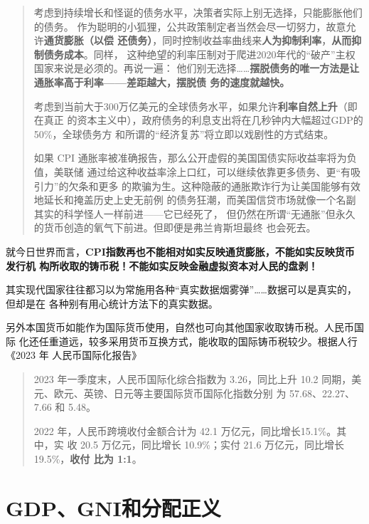 \begin{quotation}
  考虑到持续增长和怪诞的债务水平，决策者实际上别无选择，只能膨胀他们的债务。
  作为聪明的小狐狸，公共政策制定者当然会尽一切努力，故意允许\textbf{通货膨胀（以偿
    还债务）}，同时控制收益率曲线来\textbf{人为抑制利率}，\textbf{从而抑制债务成本}。同样，
  这种绝望的利率压制对于爬进2020年代的“破产”主权国家来说是必须的。再说一遍：
  他们别无选择……\textbf{摆脱债务的唯一方法是让通胀率高于利率——差距越大，摆脱债
    务的速度就越快。}

  考虑到当前大于300万亿美元的全球债务水平，如果允许\textbf{利率自然上升}（即在真正
  的资本主义中），政府债务的利息支出将在几秒钟内大幅超过GDP的50\%，全球债务方
  和所谓的“经济复苏”将立即以戏剧性的方式结束。

  如果 CPI 通胀率被准确报告，那么公开虚假的美国国债实际收益率将为负值，美联储
  通过给这种收益率涂上口红，可以继续依靠更多债务、更“有吸引力”的欠条和更多
  的欺骗为生。这种隐蔽的通胀欺诈行为让美国能够有效地延长和掩盖历史上史无前例
  的债务狂潮，而美国信贷市场就像一个名副其实的科学怪人一样前进——它已经死了，
  但仍然在所谓“无通胀”但永久的货币创造的氧气下前进。但即便是弗兰肯斯坦最终
  也会死去。
\end{quotation}

就今日世界而言，\textbf{CPI指数再也不能相对如实反映通货膨胀，不能如实反映货币发行机
  构所收取的铸币税！不能如实反映金融虚拟资本对人民的盘剥！}


其实现代国家往往都习以为常施用各种“真实数据烟雾弹”……数据可以是真实的，但却是在
各种别有用心统计方法下的真实数据。

另外本国货币如能作为国际货币使用，自然也可向其他国家收取铸币税。人民币国际
化还任重道远，较多采用货币互换方式，能收取的国际铸币税较少。根据人行《2023 年
人民币国际化报告》
\begin{quotation}
  2023 年一季度末，人民币国际化综合指数为 3.26，同比上升 10.2%
  同期，美元、欧元、英镑、日元等主要国际货币国际化指数分别
  为 57.68、22.27、7.66 和 5.48。

  2022 年，人民币跨境收付金额合计为 42.1 万亿元，同比增长15.1\%。其中，实
  收 20.5 万亿元，同比增长 10.9\%；实付 21.6 万亿元，同比增长 19.5\%，\textbf{收付
    比为 1:1}。
\end{quotation}


\section{GDP、GNI和分配正义}

